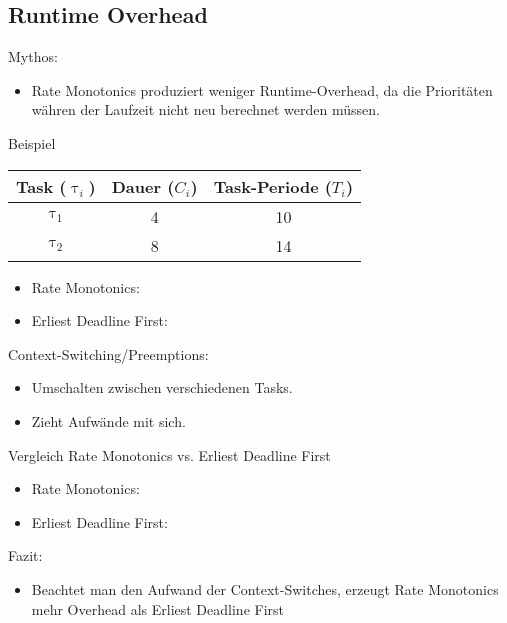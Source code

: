 \subsection{Runtime Overhead}\label{RuntimeOverhead}
\begin{frame}{Mythos:}
	\begin{itemize}
		\item Rate Monotonics produziert weniger Runtime-Overhead, da die Prioritäten währen der Laufzeit nicht neu berechnet werden müssen.
	\end{itemize}
\end{frame}

\begin{frame}{Beispiel}
	\begin{center}
		\begin{tabular}{c||c|c}
			Task ($\uptau_i$) & Dauer ($C_i$) & Task-Periode ($T_i$)\\\hline\hline
			$\uptau_1$ & 4 & 10\\
			$\uptau_2$ & 8 & 14
		\end{tabular}
	\end{center}
	\begin{itemize}
		\item Rate Monotonics:
	\end{itemize}
	
	\begin{itemize}
		\item Erliest Deadline First:	
	\end{itemize}

	
\end{frame}

\begin{frame}{Context-Switching/Preemptions:}
	\begin{itemize}
		\item Umschalten zwischen verschiedenen Tasks.
		\item Zieht Aufwände mit sich.
	\end{itemize}
\end{frame}

\newpage
\begin{frame}{Vergleich Rate Monotonics vs. Erliest Deadline First}
	\begin{itemize}
		\item Rate Monotonics:
	\end{itemize}
	
	\begin{itemize}
		\item Erliest Deadline First:	
	\end{itemize}
	
\end{frame}

\begin{frame}{Fazit:}
	\begin{itemize}
		\item Beachtet man den Aufwand der Context-Switches, erzeugt Rate Monotonics mehr Overhead als Erliest Deadline First
	\end{itemize}
\end{frame}
